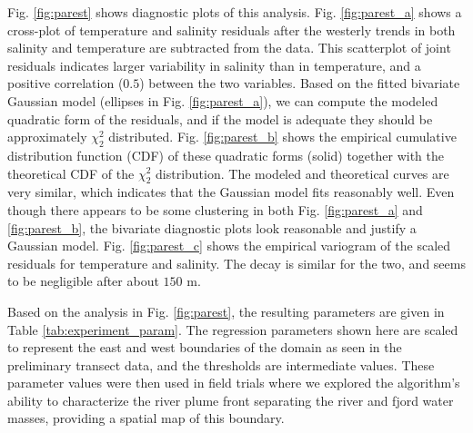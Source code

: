 \documentclass[aoas]{imsart}
\begin{document}
Fig. \ref{fig:parest} shows diagnostic plots of this
analysis. Fig. \ref{fig:parest_a} shows a cross-plot of temperature
and salinity residuals after the westerly trends in both salinity and
temperature are subtracted from the data. This scatterplot of joint
residuals indicates larger variability in salinity than in
temperature, and a positive correlation ($0.5$) between the two
variables. Based on the fitted bivariate Gaussian model (ellipses in
Fig. \ref{fig:parest_a}), we can compute the modeled quadratic form of
the residuals, and if the model is adequate they should be
approximately $\chi^2_2$ distributed. Fig. \ref{fig:parest_b} shows
the empirical cumulative distribution function (CDF) of these
quadratic forms (solid) together with the theoretical CDF of the
$\chi^2_2$ distribution. The modeled and theoretical curves are very
similar, which indicates that the Gaussian model fits reasonably
well. Even though there appears to be some clustering in both
Fig. \ref{fig:parest_a} and \ref{fig:parest_b}, the bivariate
diagnostic plots look reasonable and justify a Gaussian
model. Fig. \ref{fig:parest_c} shows the empirical variogram of the
scaled residuals for temperature and salinity. The decay is similar
for the two, and seems to be negligible after about $150$ m.


Based on the analysis in Fig. \ref{fig:parest}, the resulting
parameters are given in Table \ref{tab:experiment_param}. The
regression parameters shown here are scaled to represent the east and
west boundaries of the domain as seen in the preliminary transect
data, and the thresholds are intermediate values. These parameter
values were then used in field trials where we explored the
algorithm's ability to characterize the river plume front separating
the river and fjord water masses, providing a spatial map of this
boundary.

\end{document}
